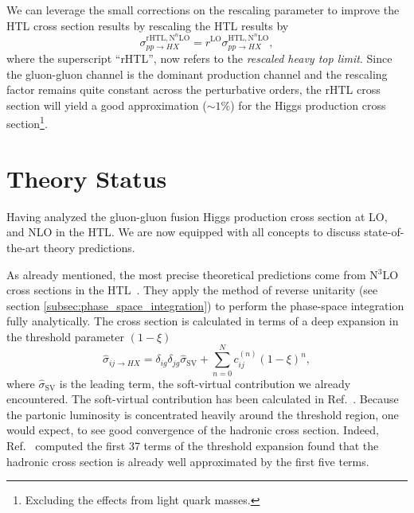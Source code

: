 We can leverage the small corrections on the rescaling parameter to improve the \acs{HTL} cross section results by rescaling the \acs{HTL} results by
\begin{equation}
\sigma_{pp \rightarrow HX}^{\mathrm{rHTL}, \mathrm{N}^n\mathrm{LO}} = r^{\mathrm{LO}} \sigma_{pp \rightarrow HX}^{\mathrm{HTL}, \mathrm{N}^n\mathrm{LO}},
\end{equation}
where the superscript ``\acs{rHTL}'', now refers to the \textit{rescaled heavy top limit}. Since the gluon-gluon channel is the dominant production channel and the rescaling factor remains quite constant across the perturbative orders, the \acs{rHTL} cross section will yield a good approximation ($\sim 1 \%$) for the Higgs production cross section\footnote{Excluding the effects from light quark masses.}.




\section{Theory Status}
Having analyzed the gluon-gluon fusion Higgs production cross section at \acs{LO}, and \acs{NLO} in the \acs{HTL}. We are now equipped with all concepts to discuss state-of-the-art theory predictions.

As already mentioned, the most precise theoretical predictions come from N${}^3$LO cross sections in the \acs{HTL}~\cite{Anastasiou:2015vya, Anastasiou:2016cez}. They apply the method of reverse unitarity (see section \ref{subsec:phase_space_integration}) to perform the phase-space integration fully analytically. The cross section is calculated in terms of a deep expansion in the threshold parameter $(1 - \xi)$
\begin{equation}
\hat{\sigma}_{ij \rightarrow HX} = \delta_{ig} \delta_{jg} \hat{\sigma}_{\mathrm{SV}} + \sum_{n = 0}^N c_{ij}^{(n)} (1 - \xi)^n,
\label{eq:4:threshold_expansion}
\end{equation}
where $\hat{\sigma}_{\mathrm{SV}}$ is the leading term, the soft-virtual contribution we already encountered. The soft-virtual contribution has been calculated in Ref.~\cite{Anastasiou:2014vaa}. Because the partonic luminosity is concentrated heavily around the threshold region, one would expect, to see good convergence of the hadronic cross section. Indeed, Ref.~\cite{Anastasiou:2015vya} computed the first 37 terms of the threshold expansion found that the hadronic cross section is already well approximated by the first five terms.

